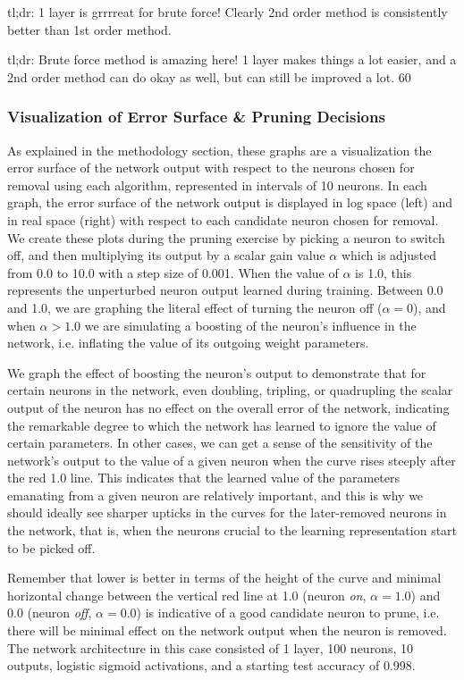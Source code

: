 tl;dr: 1 layer is grrrreat for brute force! Clearly 2nd order method is consistently better than 1st order method. 

tl;dr: Brute force method is amazing here! 1 layer makes things a lot easier, and a 2nd order method can do okay as well, but can still be improved a lot. 60%

\subsubsection{Visualization of Error Surface \& Pruning Decisions}
As explained in the methodology section, these graphs are a visualization the error surface of the network output with respect to the neurons chosen for removal using each algorithm, represented in intervals of 10 neurons. In each graph, the error surface of the network output is displayed in log space (left) and in real space (right) with respect to each candidate neuron chosen for removal. We create these plots during the pruning exercise by picking a neuron to switch off, and then multiplying its output by a scalar gain value $\alpha$ which is adjusted from 0.0 to 10.0 with a step size of 0.001. When the value of $\alpha$ is 1.0, this represents the unperturbed neuron output learned during training. Between 0.0 and 1.0, we are graphing the literal effect of turning the neuron off ($\alpha = 0$), and when $\alpha > 1.0$ we are simulating a boosting of the neuron's influence in the network, i.e. inflating the value of its outgoing weight parameters. 

We graph the effect of boosting the neuron's output to demonstrate that for certain neurons in the network, even doubling, tripling, or quadrupling the scalar output of the neuron has no effect on the overall error of the network, indicating the remarkable degree to which the network has learned to ignore the value of certain parameters. In other cases, we can get a sense of the sensitivity of the network's output to the value of a given neuron when the curve rises steeply after the red 1.0 line. This indicates that the learned value of the parameters emanating from a given neuron are relatively important, and this is why we should ideally see sharper upticks in the curves for the later-removed neurons in the network, that is, when the neurons crucial to the learning representation start to be picked off. 

Remember that lower is better in terms of the height of the curve and minimal horizontal change between the vertical red line at 1.0 (neuron \textit{on}, $\alpha = 1.0$) and 0.0 (neuron \textit{off}, $\alpha = 0.0$) is indicative of a good candidate neuron to prune, i.e. there will be minimal effect on the network output when the neuron is removed. The network architecture in this case consisted of 1 layer, 100 neurons, 10 outputs, logistic sigmoid activations, and a starting test accuracy of 0.998.

